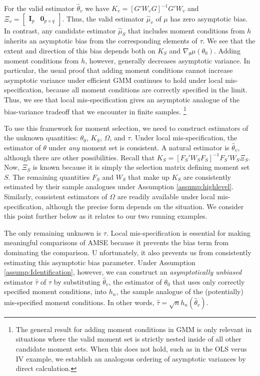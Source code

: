 \documentclass[12pt]{article}
\theoremstyle{definition}
\begin{document}
For the valid estimator $\widehat{\theta}_v$ we have $K_v = \left[G'W_{v}G\right]^{-1}G' W_{v}$ and $\Xi_v =\left[\begin{array}{cc} \mathbf{I}_p& \mathbf{0}_{p\times q} \end{array} \right]$. 
Thus, the valid estimator $\widehat{\mu}_v$ of $\mu$ has zero asymptotic bias. 
In contrast, any candidate estimator $\widehat{\mu}_S$ that includes moment conditions from $h$ inherits an asymptotic bias from the corresponding elements of $\tau$. 
We see that the extent and direction of this bias depends both on $K_S$ and $\nabla_\theta\mu(\theta_0)$. 
Adding moment conditions from $h$, however, generally decreases asymptotic variance. 
In particular, the usual proof that adding moment conditions cannot increase asymptotic variance under efficient GMM \citep[see for example][ch.\ 6]{Hallbook} continues to hold under local mis-specification, because all moment conditions are correctly specified in the limit. 
Thus, we see that local mis-specification gives an asymptotic analogue of the bias-variance tradeoff that we encounter in finite samples.
\footnote{The general result for adding moment conditions in GMM is only relevant in situations where the valid moment set is strictly nested inside of all other candidate moment sets. When this does not hold, such as in the OLS verus IV example, we establish an analogous ordering of asymptotic variances by direct calculation.} 

To use this framework for moment selection, we need to construct estimators of the unknown quantities: $\theta_0$, $K_S$, $\Omega$, and $\tau$. 
Under local mis-specification, the estimator of $\theta$ under \emph{any} moment set is consistent. 
A natural estimator is $\widehat{\theta}_v$, although there are other possibilities. 
Recall that $K_S = [F_S'W_SF_S]^{-1} F_S'W_S \Xi_S$.
Now, $\Xi_S$ is known because it is simply the selection matrix defining moment set $S$. 
The remaining quantities $F_S$ and $W_S$ that make up $K_S$ are consistently estimated by their sample analogues under Assumption \ref{assump:highlevel}.
Similarly, consistent estimators of $\Omega$ are readily available under local mis-specification, although the precise form depends on the situation.
We consider this point further below as it relates to our two running examples.

The only remaining unknown is $\tau$. Local mis-specification is essential for making meaningful comparisons of AMSE because it prevents the bias term from dominating the comparison. U
nfortunately, it also prevents us from consistently estimating this asymptotic bias parameter. 
Under Assumption \ref{assump:Identification}, however, we can construct an \emph{asymptotically unbiased} estimator $\widehat{\tau}$ of $\tau$ by substituting $\widehat{\theta}_v$, the estimator of $\theta_0$ that uses only correctly specified moment conditions, into $h_n$, the sample analogue of the (potentially) mis-specified moment conditions. 
In other words,  $\widehat{\tau} = \sqrt{n} h_n(\widehat{\theta}_v)$. 
\end{document}
